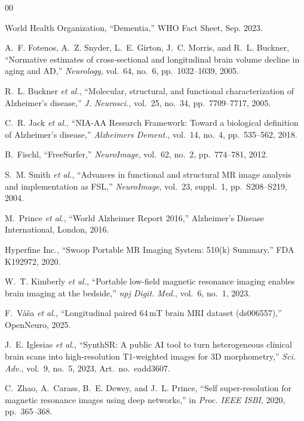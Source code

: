 \documentclass{ieeeaccess}
\begin{document}
\begin{thebibliography}{00}

World Health Organization, ``Dementia,'' WHO Fact Sheet, Sep. 2023.

A.~F. Fotenos, A.~Z. Snyder, L.~E. Girton, J.~C. Morris, and R.~L. Buckner,
``Normative estimates of cross-sectional and longitudinal brain volume
decline in aging and AD,''
\emph{Neurology}, vol.~64, no.~6, pp.~1032--1039, 2005.

R.~L. Buckner \emph{et al.},
``Molecular, structural, and functional characterization of Alzheimer's
disease,''
\emph{J. Neurosci.}, vol.~25, no.~34, pp.~7709--7717, 2005.

C.~R. Jack \emph{et al.},
``NIA-AA Research Framework: Toward a biological definition of
Alzheimer's disease,''
\emph{Alzheimers Dement.}, vol.~14, no.~4, pp.~535--562, 2018.

B.~Fischl, ``FreeSurfer,''
\emph{NeuroImage}, vol.~62, no.~2, pp.~774--781, 2012.

S.~M. Smith \emph{et al.},
``Advances in functional and structural MR image analysis and
implementation as FSL,''
\emph{NeuroImage}, vol.~23, suppl.~1, pp.~S208--S219, 2004.

M.~Prince \emph{et al.},
``World Alzheimer Report 2016,''
Alzheimer's Disease International, London, 2016.

Hyperfine Inc., ``Swoop Portable MR Imaging System: 510(k) Summary,''
FDA K192972, 2020.

W.~T. Kimberly \emph{et al.},
``Portable low-field magnetic resonance imaging enables brain imaging
at the bedside,''
\emph{npj Digit. Med.}, vol.~6, no.~1, 2023.

F.~V{\'a}{\v s}a \emph{et al.},
``Longitudinal paired 64\,mT brain MRI dataset (ds006557),''
OpenNeuro, 2025.

J.~E. Iglesias \emph{et al.},
``SynthSR: A public AI tool to turn heterogeneous clinical brain scans
into high-resolution T1-weighted images for 3D morphometry,''
\emph{Sci. Adv.}, vol.~9, no.~5, 2023, Art.~no.~eadd3607.

C.~Zhao, A.~Carass, B.~E. Dewey, and J.~L. Prince,
``Self super-resolution for magnetic resonance images using deep
networks,''
in \emph{Proc. IEEE ISBI}, 2020, pp.~365--368.


\end{thebibliography}
\end{document}
